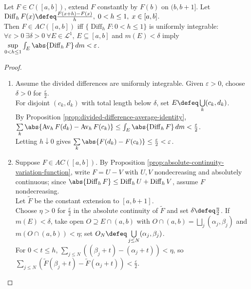 \begin{theorem} \label{thm:absolute-continuity-divided-differences-uniform-integrability} \\
Let $F\in C([a,b])$, extend $F$ constantly by $F(b)$ on $(b,b+1]$. Let
$\operatorname{Diff}_hF(x)\defeq\frac{F(x+h)-F(x)}{h}, \; 0<h\leq1,\; x\in[a,b]$.\\
Then $F\in AC([a,b])$ iff $\{\operatorname{Diff}_hF:0<h\leq1\}$ is uniformly integrable:\\
$\forall\varepsilon>0\ \exists\delta>0\ \forall E\in\mathcal{L}^1$, $E\subseteq[a,b]$ and $m(E)<\delta$ imply $\sup\limits_{0<h\leq1}\int_E\abs{\operatorname{Diff}_hF}\,dm<\varepsilon$.
\begin{proof}
\begin{enumerate}[label=(\roman*)]
\setlength{\itemsep}{0pt}
\item[$(\Leftarrow)$] Assume the divided differences are uniformly integrable. Given $\varepsilon>0$, choose $\delta>0$ for $\frac{\varepsilon}{2}$.\\
For disjoint $(c_k,d_k)$ with total length below $\delta$, set $E\defeq\bigcup\limits_k(c_k,d_k)$.\\
By Proposition \ref{prop:divided-difference-average-identity}, $\sum\limits_k\abs{\operatorname{Av}_hF(d_k)-\operatorname{Av}_hF(c_k)}\leq\int_E\abs{\operatorname{Diff}_hF}\,dm<\frac{\varepsilon}{2}$.\\
Letting $h\downarrow0$ gives $\sum\limits_k\abs{F(d_k)-F(c_k)}\leq\frac{\varepsilon}{2}<\varepsilon$.
\item[$(\Rightarrow)$] Suppose $F\in AC([a,b])$. By Proposition \ref{prop:absolute-continuity-variation-function}, write $F=U-V$ with $U,V$ nondecreasing and absolutely continuous; since $\abs{\operatorname{Diff}_hF}\leq\operatorname{Diff}_hU+\operatorname{Diff}_hV$, assume $F$ nondecreasing.\\
Let $\widetilde F$ be the constant extension to $[a,b+1]$.\\
Choose $\eta>0$ for $\frac{\varepsilon}{2}$ in the absolute continuity of $\widetilde F$ and set $\delta\defeq\frac{\eta}{2}$. If $m(E)<\delta$, take open $O\supseteq E\cap(a,b)$ with $O\cap(a,b)=\bigsqcup\limits_j(\alpha_j,\beta_j)$ and $m(O\cap(a,b))<\eta$; set $O_N\defeq\bigcup\limits_{j\leq N}(\alpha_j,\beta_j)$.\\
For $0<t\leq h$, $\sum\limits_{j\leq N}((\beta_j+t)-(\alpha_j+t))<\eta$, so $\sum\limits_{j\leq N}(\widetilde F(\beta_j+t)-\widetilde F(\alpha_j+t))<\frac{\varepsilon}{2}$.\\

\end{enumerate}
\end{proof}
\end{theorem}
